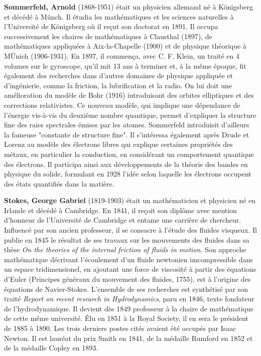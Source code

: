 \textbf{Sommerfeld, Arnold} (1868-1951) était un physicien allemand né à Königsberg et décédé à Münch. Il étudia les mathématiques et les sciences naturelles à l'Université de Königsberg où il reçut son doctorat en 1891. Il occupa successivement les chaires de mathématiques à Clausthal (1897), de mathématiques appliquées à Aix-la-Chapelle (1900) et de physique théorique à MÜnich (1906-1931). En 1897, il commença, avec C. F. Klein, un traité en 4 volumes sur le gyroscope, qu'il mit 13 ans à terminer et, à la même époque, fit également des recherches dans d'autres domaines de physique appliquée et d'ingénierie, comme la friction, la lubrification et la radio. On lui doit une amélioration du modèle de Bohr (1916) introduisant des orbites elliptiques et des corrections relativistes. Ce nouveau modèle, qui implique une dépendance de l'énergie vis-à-vis du deuxième nombre quantique, permet d'expliquer la structure fine des raies spectrales émises par les atomes. Sommerfeld introduisit d'ailleurs la fameuse "constante de structure fine". Il s'intéressa également après Drude et Lorenz au modèle des électrons libres qui explique certaines propriétés des métaux, en particulier la conduction, en considérant un comportement quantique des électrons. Il participa ainsi aux développements de la théorie des bandes en physique du solide, formulant en 1928 l'idée selon laquelle les électrons occupent des états quantifiés dans la matière.

\textbf{Stokes, George Gabriel} (1819-1903) était un mathématicien et physicien né en Irlande et décédé à Cambridge. En 1841, il reçoit son diplôme avec mention d'honneur de l'Université de Cambridge et entame une carrière de chercheur. Influencé par son ancien professeur, il se consacre à l'étude des fluides visqueux. Il publie en 1845 le résultat de ses travaux sur les mouvements des fluides dans sa thèse \textit{On the theories of the internal friction of fluids in motion}. Son approche mathématique décrivant l'écoulement d'un fluide newtonien imcompressible dans un espace tridimensionel, en ajoutant une force de viscosité à partir des équations d'Euler (Principes généraux du mouvement des fluides, 1755), est à l'origine des équations de Navier-Stokes. L'ensemble de ses recherches est synthétisé par son traité \textit{Report on recent research in Hydrodynamics}, paru en 1846, texte fondateur de l'hydrodynamique. Il devient dès 1849 professeur à la chaire de mathématique de cette même université. Élu en 1851 à la Royal Society, il en sera le président de 1885 à 1890. Les trois derniers postes cités avaient été occupés par Isaac Newton. Il est lauréat du prix Smith en 1841, de la médaille Rumford en 1852 et de la médaille Copley en 1893.

